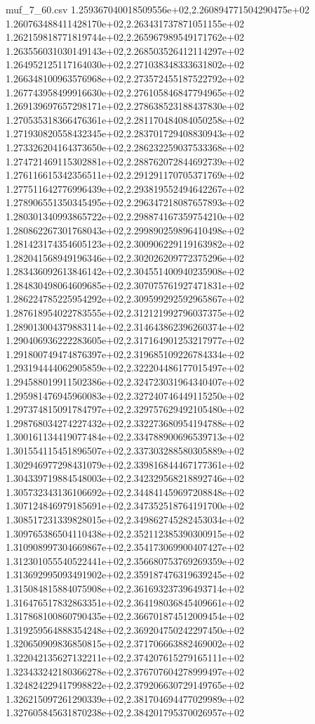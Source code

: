 \begin{filecontents*}{muf_7_60.csv}
1.259367040018509556e+02,2.260894771504290475e+02
1.260763488411428170e+02,2.263431737871051155e+02
1.262159818771819744e+02,2.265967989549171762e+02
1.263556031030149143e+02,2.268503526412114297e+02
1.264952125117164030e+02,2.271038348333631802e+02
1.266348100963576968e+02,2.273572455187522792e+02
1.267743958499916630e+02,2.276105846847794965e+02
1.269139697657298171e+02,2.278638523188437830e+02
1.270535318366476361e+02,2.281170484084050258e+02
1.271930820558432345e+02,2.283701729408830943e+02
1.273326204164373650e+02,2.286232259037533368e+02
1.274721469115302881e+02,2.288762072844692739e+02
1.276116615342356511e+02,2.291291170705371769e+02
1.277511642776996439e+02,2.293819552494642267e+02
1.278906551350345495e+02,2.296347218087657893e+02
1.280301340993865722e+02,2.298874167359754210e+02
1.280862267301768043e+02,2.299890259896410498e+02
1.281423174354605123e+02,2.300906229119163982e+02
1.282041568949196346e+02,2.302026209772375296e+02
1.283436092613846142e+02,2.304551400940235908e+02
1.284830498064609685e+02,2.307075761927471831e+02
1.286224785225954292e+02,2.309599292592965867e+02
1.287618954022783555e+02,2.312121992796037375e+02
1.289013004379883114e+02,2.314643862396260374e+02
1.290406936222283605e+02,2.317164901253217977e+02
1.291800749474876397e+02,2.319685109226784334e+02
1.293194444062905859e+02,2.322204486177015497e+02
1.294588019911502386e+02,2.324723031964340407e+02
1.295981476945960083e+02,2.327240746449115250e+02
1.297374815091784797e+02,2.329757629492105480e+02
1.298768034274227432e+02,2.332273680954194788e+02
1.300161134419077484e+02,2.334788900696539713e+02
1.301554115451896507e+02,2.337303288580305889e+02
1.302946977298431079e+02,2.339816844467177361e+02
1.304339719884548003e+02,2.342329568218892746e+02
1.305732343136106692e+02,2.344841459697208848e+02
1.307124846979185691e+02,2.347352518764191700e+02
1.308517231339828015e+02,2.349862745282453034e+02
1.309765386504110438e+02,2.352112385390300915e+02
1.310908997304669867e+02,2.354173069900407427e+02
1.312301055540522441e+02,2.356680753769269359e+02
1.313692995093491902e+02,2.359187476319639245e+02
1.315084815884075908e+02,2.361693237396493714e+02
1.316476517832863351e+02,2.364198036845409661e+02
1.317868100860790435e+02,2.366701874512009454e+02
1.319259564888354248e+02,2.369204750242297450e+02
1.320650909836850815e+02,2.371706663882469002e+02
1.322042135627132211e+02,2.374207615279165111e+02
1.323433242180366278e+02,2.376707604278999497e+02
1.324824229417998822e+02,2.379206630729149765e+02
1.326215097261290339e+02,2.381704694477029989e+02
1.327605845631870238e+02,2.384201795370026957e+02

\end{filecontents*}
